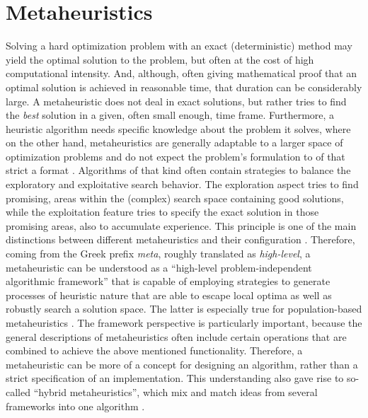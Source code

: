 \section{Metaheuristics}
\label{chap:meta}

Solving a hard optimization problem with an exact (deterministic) method may yield the optimal solution to the problem, but often at the cost of high computational intensity. And, although, often giving mathematical proof that an optimal solution is achieved in reasonable time, that duration can be considerably large. A metaheuristic does not deal in exact solutions, but rather tries to find the \textit{best} solution in a given, often small enough, time frame. 
Furthermore, a heuristic algorithm needs specific knowledge about the problem it solves, where on the other hand, metaheuristics are generally adaptable to a larger space of optimization problems and do not expect the problem's formulation to of that strict a format \cite{sorensen2013metaheuristics}. 
Algorithms of that kind often contain strategies to balance the exploratory and exploitative search behavior. The exploration aspect tries to find promising, areas within the (complex) search space containing good solutions, while the exploitation feature tries to specify the exact solution in those promising areas, also to accumulate experience. This principle is one of the main distinctions between different metaheuristics and their configuration \cite{boussaid2013survey}.
Therefore, coming from the Greek prefix \textit{meta}, roughly translated as \textit{high-level}, a metaheuristic can be understood as a \enquote{high-level problem-independent algorithmic framework} \cite{sorensen2013metaheuristics} that is capable of employing strategies to generate processes of heuristic nature that are able to escape local optima as well as robustly search a solution space. The latter is especially true for population-based metaheuristics \cite{gendreau2010handbook}. 
The framework perspective is particularly important, because the general descriptions of metaheuristics often include certain operations that are combined to achieve the above mentioned functionality. Therefore, a metaheuristic can be more of a concept for designing an algorithm, rather than a strict specification of an implementation. This understanding also gave rise to so-called \enquote{hybrid metaheuristics}, which mix and match ideas from several frameworks into one algorithm \cite{sorensen2018history}.

